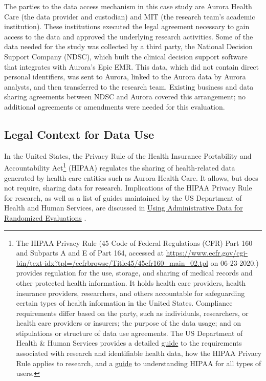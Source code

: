 The parties to the data access mechanism in this case study are Aurora Health Care (the data provider and custodian) and MIT (the research team's academic institution). These institutions executed the legal agreement necessary to gain access to the data and approved the underlying research activities. Some of the data needed for the study was collected by a third party, the National Decision Support Company (NDSC), which built the clinical decision support software that integrates with Aurora's Epic EMR. This data, which did not contain direct personal identifiers, was sent to Aurora, linked to the Aurora data by Aurora analysts, and then transferred to the research team. Existing business and data sharing agreements between NDSC and Aurora covered this arrangement; no additional agreements or amendments were needed for this evaluation.

\hypertarget{legal-context-for-data-use-3}{%
\subsection{Legal Context for Data Use}\label{legal-context-for-data-use-3}}

In the United States, the Privacy Rule of the Health Insurance Portability and Accountability Act\footnote{The HIPAA Privacy Rule (45 Code of Federal Regulations (CFR) Part 160 and Subparts A and E of Part 164, accessed at \url{https://www.ecfr.gov/cgi-bin/text-idx?tpl=/ecfrbrowse/Title45/45cfr160_main_02.tpl} on 06-23-2020.) provides regulation for the use, storage, and sharing of medical records and other protected health information. It holds health care providers, health insurance providers, researchers, and others accountable for safeguarding certain types of health information in the United States. Compliance requirements differ based on the party, such as individuals, researchers, or health care providers or insurers; the purpose of the data usage; and on stipulations or structure of data use agreements. The US Department of Health \& Human Services provides a detailed \href{https://www.hhs.gov/hipaa/for-professionals/special-topics/research/index.html}{guide} \citep[see][]{u.s.departmentofhealthhumanservices2018a} to the requirements associated with research and identifiable health data, how the HIPAA Privacy Rule applies to research, and a \href{https://www.hhs.gov/hipaa/index.html}{guide} \citep[see][]{us_department_of_health__human_services_health_nodate} to understanding HIPAA for all types of users.} (HIPAA) regulates the sharing of health-related data generated by health care entities such as Aurora Health Care. It allows, but does not require, sharing data for research. Implications of the HIPAA Privacy Rule for research, as well as a list of guides maintained by the US Department of Health and Human Services, are discussed in \href{https://www.povertyactionlab.org/resource/using-administrative-data-randomized-evaluations}{Using Administrative Data for Randomized Evaluations} \citep{feeney2015}.

